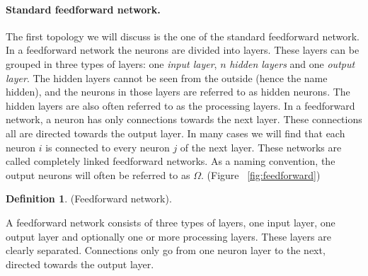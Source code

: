\documentclass[pdftex,a4paper,12pt,twoside]{report}
\theoremstyle{plain} \newtheorem{theorem}{Theorem} \newtheorem{proposition}{Proposition} \newtheorem{lemma}{Lemma} \newtheorem*{corollary}{Corollary}
\theoremstyle{definition} \newtheorem{definition}{Definition} \newtheorem{conjecture}{Conjecture} \newtheorem*{example}{Example} \newtheorem{algorithm}{Algorithm}
\theoremstyle{remark} \newtheorem*{remark}{Remark} \newtheorem*{note}{Note} \newtheorem{case}{Case}
\begin{document}
\paragraph{Standard feedforward network.\label{par:feedforward}} The first topology we will discuss is the one of the standard feedforward network. In a feedforward network the neurons are divided into layers. These layers can be grouped in three types of layers: one \emph{input layer}, $n$ \emph{hidden layers} and one \emph{output layer}. The hidden layers cannot be seen from the outside (hence the name hidden), and the neurons in those layers are referred to as hidden neurons. The hidden layers are also often referred to as the processing layers. In a feedforward network, a neuron has only connections towards the next layer. These connections all are directed towards the output layer. In many cases we will find that each neuron $i$ is connected to every neuron $j$ of the next layer. These networks are called completely linked feedforward networks. As a naming convention, the output neurons will often be referred to as $\Omega$. (Figure ~\ref{fig:feedforward})
\begin{definition}
(Feedforward network). 
\end{definition} A feedforward network consists of three types of layers, one input layer, one output layer and optionally one or more processing layers. These layers are clearly separated. Connections only go from one neuron layer to the next, directed towards the output layer.
\end{document}
